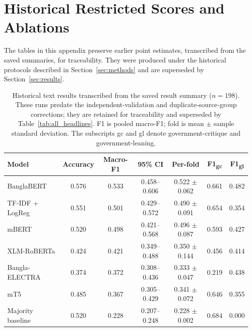 \documentclass[11pt]{article}
\begin{document}

\appendix
\section{Historical Restricted Scores and Ablations}\label{sec:historical}
The tables in this appendix preserve earlier point estimates, transcribed from the saved summaries, for traceability. They were produced under the historical protocols described in Section~\ref{sec:methods} and are superseded by Section~\ref{sec:results}.
\begin{table}[ht]
\footnotesize
\centering
\caption{Historical text results transcribed from the saved result summary ($n=198$). These runs predate the independent-validation and duplicate-source-group corrections; they are retained for traceability and superseded by Table~\ref{tab:all_headlines}. F1 is pooled macro-F1; fold is mean $\pm$ sample standard deviation. The subscripts gc and gl denote government-critique and government-leaning.}
\begin{tabular}{|l|c|c|c|c|c|c|}
\hline
\textbf{Model} & \textbf{Accuracy} & \textbf{Macro-F1} & \textbf{95\% CI} & \textbf{Per-fold} & \textbf{F1\textsubscript{gc}} & \textbf{F1\textsubscript{gl}} \\
\hline
BanglaBERT        & 0.576 & 0.533 & 0.458--0.606 & 0.522 $\pm$ 0.062 & 0.661 & 0.482 \\
TF-IDF + LogReg   & 0.551 & 0.501 & 0.429--0.572 & 0.490 $\pm$ 0.091 & 0.654 & 0.354 \\
mBERT             & 0.520 & 0.498 & 0.421--0.568 & 0.496 $\pm$ 0.087 & 0.593 & 0.427 \\
XLM-RoBERTa       & 0.424 & 0.421 & 0.349--0.488 & 0.350 $\pm$ 0.144 & 0.456 & 0.414 \\
Bangla-ELECTRA    & 0.374 & 0.372 & 0.308--0.436 & 0.333 $\pm$ 0.047 & 0.219 & 0.438 \\
mT5               & 0.485 & 0.367 & 0.305--0.429 & 0.341 $\pm$ 0.072 & 0.646 & 0.355 \\
Majority baseline & 0.520 & 0.228 & 0.207--0.248 & 0.228 $\pm$ 0.002 & 0.684 & 0.000 \\
\hline
\end{tabular}
\label{tab:text_models}
\end{table}
\end{document}
